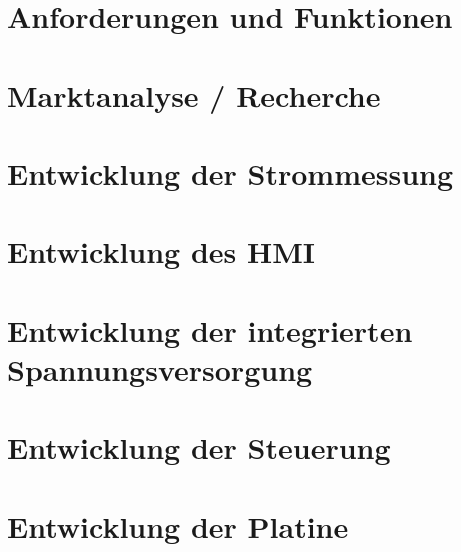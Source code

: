 \section{Anforderungen und Funktionen}

\section{Marktanalyse / Recherche}

\section{Entwicklung der Strommessung}

\section{Entwicklung des HMI}

\section{Entwicklung der integrierten Spannungsversorgung}

\section{Entwicklung der Steuerung}

\section{Entwicklung der Platine}